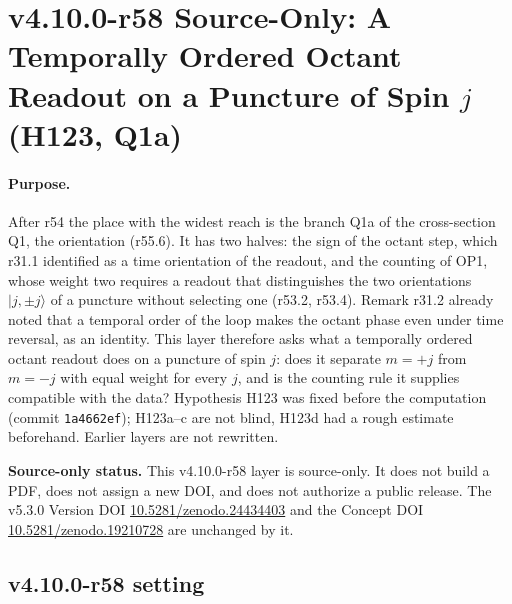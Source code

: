 \clearpage
\section*{v4.10.0-r58 Source-Only: A Temporally Ordered Octant Readout on a Puncture of Spin \(j\) (H123, Q1a)}
\label{sec:v4100-r58-temporal-octant}

\paragraph{Purpose.}
After r54 the place with the widest reach is the branch Q1a of the cross-section Q1, the orientation (r55.6).  It has two halves: the sign of
the octant step, which r31.1 identified as a time orientation of the readout, and the counting of OP1, whose weight two requires a readout that
distinguishes the two orientations \(|j,\pm j\rangle\) of a puncture without selecting one (r53.2, r53.4).  Remark r31.2 already noted that a temporal
order of the loop makes the octant phase even under time reversal, as an identity.  This layer therefore asks what a temporally ordered
octant readout does on a puncture of spin \(j\): does it separate \(m=+j\) from \(m=-j\) with equal weight for every \(j\), and is the counting rule it
supplies compatible with the data?  Hypothesis H123 was fixed before the computation (commit \texttt{1a4662ef}); H123a--c are not blind,
H123d had a rough estimate beforehand.  Earlier layers are not rewritten.

\noindent\textbf{Source-only status.}
This v4.10.0-r58 layer is source-only.  It does not build a PDF, does not assign a new DOI,
and does not authorize a public release.  The v5.3.0 Version DOI
\href{https://doi.org/10.5281/zenodo.24434403}{10.5281/zenodo.24434403} and the Concept DOI
\href{https://doi.org/10.5281/zenodo.19210728}{10.5281/zenodo.19210728} are unchanged by it.

\subsection*{v4.10.0-r58 setting}
\label{subsec:v4100-r58-setting}

